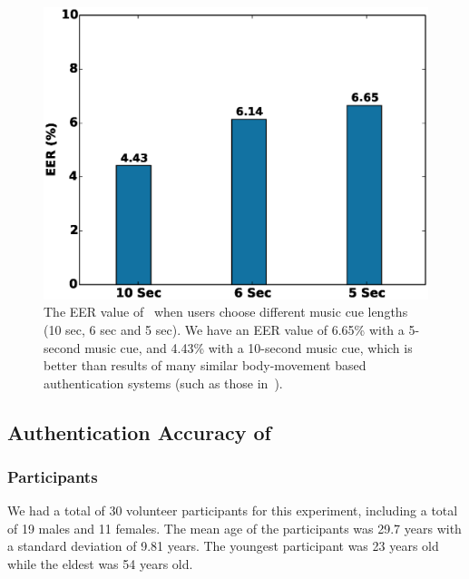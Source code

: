 


\begin{figure}[t]
\centering
\includegraphics [width=.85\columnwidth]{figure/exp2_eer_vary_length.eps}
\caption{The EER value of \systemname~when users choose different music cue lengths (10 sec, 6 sec and 5
sec). We have an EER value of 6.65\% with a 5-second music cue, and 4.43\% with a 10-second music cue, which is better than results of many similar body-movement based authentication systems (such as those in~\cite{gafurov2006biometric,ahmed2015checksum,rogers2015approach}).}
\label{fig:eer-length}
\vspace{-1mm}
\end{figure}




\subsection{Authentication Accuracy of \systemname}

\subsubsection{Participants}
We had a total of 30 volunteer participants for this experiment, including a total of 19 males and 11 females.
The mean age of the participants was 29.7 years with a standard deviation
of 9.81 years. The youngest participant was 23 years old while the eldest was
54 years old.

